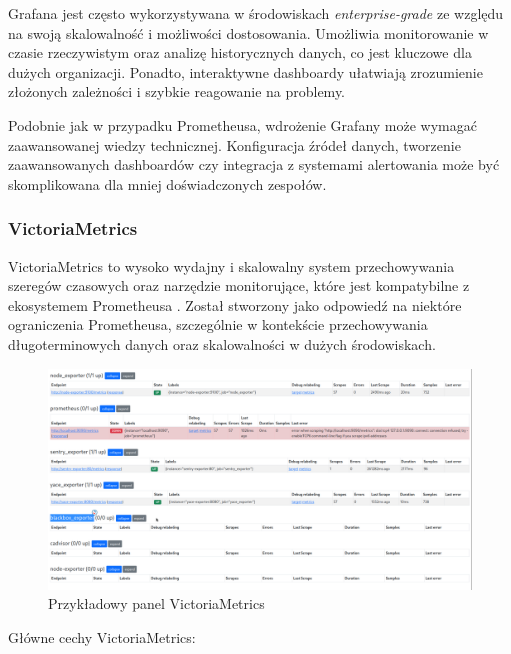 \documentclass{article}
\begin{document}
Grafana jest często wykorzystywana w środowiskach \textit{enterprise-grade} ze względu na swoją skalowalność i możliwości dostosowania. Umożliwia monitorowanie w czasie rzeczywistym oraz analizę historycznych danych, co jest kluczowe dla dużych organizacji. Ponadto, interaktywne dashboardy ułatwiają zrozumienie złożonych zależności i szybkie reagowanie na problemy.

Podobnie jak w przypadku Prometheusa, wdrożenie Grafany może wymagać zaawansowanej wiedzy technicznej. Konfiguracja źródeł danych, tworzenie zaawansowanych dashboardów czy integracja z systemami alertowania może być skomplikowana dla mniej doświadczonych zespołów.

\subsubsection{VictoriaMetrics}

VictoriaMetrics to wysoko wydajny i skalowalny system przechowywania szeregów czasowych oraz narzędzie monitorujące, które jest kompatybilne z ekosystemem Prometheusa \cite{VictoriaMetricsBlog}. Został stworzony jako odpowiedź na niektóre ograniczenia Prometheusa, szczególnie w kontekście przechowywania długoterminowych danych oraz skalowalności w dużych środowiskach.

\begin{figure}[H]
    \centering
    \includegraphics[width=1\linewidth]{victoriaMetricsPrzyklad.png}
    \caption{Przykładowy panel VictoriaMetrics}
    \label{fig:enter-label}
\end{figure}

Główne cechy VictoriaMetrics:
\end{document}
